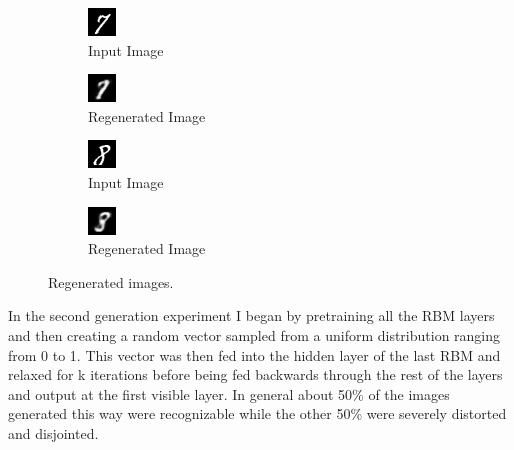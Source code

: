\documentclass{article}
\begin{document}
	\begin{figure}[h]
		\centering
		\begin{subfigure}[b]{0.3\textwidth}
			\centering
			\includegraphics[scale=2.0]{images/in0}
			\caption{Input Image}
		\end{subfigure}
		\begin{subfigure}[b]{0.3\textwidth}
			\centering
			\includegraphics[scale=2.0]{images/gen0}
			\caption{Regenerated Image}
		\end{subfigure}
	
		\begin{subfigure}[b]{0.3\textwidth}
			\centering
			\includegraphics[scale=2.0]{images/in1}
			\caption{Input Image}
		\end{subfigure}
		\begin{subfigure}[b]{0.3\textwidth}
			\centering
			\includegraphics[scale=2.0]{images/gen1}
			\caption{Regenerated Image}
		\end{subfigure}
	
		\caption{Regenerated images.}
		\label{fig:regenerated}
	\end{figure}

	In the second generation experiment I began by pretraining all the RBM layers and then creating a random vector sampled from a uniform distribution ranging from 0 to 1. This vector was then fed into the hidden layer of the last RBM and relaxed for k iterations before being fed backwards through the rest of the layers and output at the first visible layer. In general about 50\% of the images generated this way were recognizable while the other 50\% were severely distorted and disjointed. 
	
\end{document}
